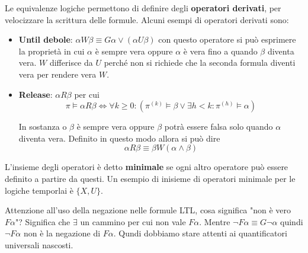 Le equivalenze logiche permettono di definire degli \textbf{operatori derivati},
per velocizzare la scrittura delle formule. Alcuni esempi di operatori derivati
sono:
\begin{itemize}
    \item \textbf{Until debole}: $\alpha W \beta \equiv G\alpha \lor
              (\alpha U \beta)$ con questo operatore si può esprimere la proprietà
          in cui $\alpha$ è sempre vera oppure $\alpha$ è vera fino a quando
          $\beta$ diventa vera. $W$ differisce da $U$ perché non si richiede che
          la seconda formula diventi vera per rendere vera $W$.
    \item \textbf{Release}: $\alpha R \beta$ per cui
          \begin{equation}
              \pi\vDash\alpha R \beta \iff \forall k\ge 0:(\pi^{(k)}\vDash \beta\lor
              \exists h<k:\pi^{(h)}\vDash \alpha)
          \end{equation}

          In sostanza o $\beta$ è sempre vera oppure $\beta$ potrà essere falsa
          solo quando $\alpha$ diventa vera. Definito in questo modo allora si può dire
          \begin{equation}
              \alpha R \beta \equiv \beta W (\alpha \land \beta)
          \end{equation}
\end{itemize}
\begin{definizione}
    L'insieme degli operatori è detto \textbf{minimale} se ogni altro
    operatore può essere definito a partire da questi. Un esempio di inisieme di
    operatori minimale per le logiche temporlai è $\{X,U\}$.
\end{definizione}
Attenzione all'uso della negazione nelle formule LTL, cosa significa "non è vero
$F\alpha$"?  Significa che $\exists$ un cammino per cui non vale $F\alpha$.  Mentre
$\lnot F\alpha \equiv G\lnot \alpha$ quindi $\lnot F\alpha$ non è la negazione di
$F\alpha$. Qundi dobbiamo stare attenti ai quantificatori universali nascosti.

